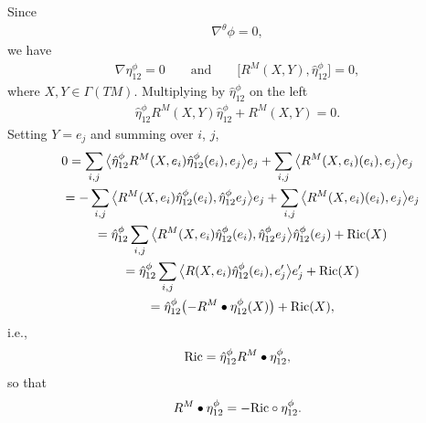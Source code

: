 \documentclass[pdftex]{sigma}
\numberwithin{equation}{section}
\begin{document}
Since
\begin{gather*}\nabla^\theta \phi =0,\end{gather*}
we have
\begin{gather*}
 \nabla \eta_{12}^\phi= 0
\qquad \text{and}\qquad
\big[{R^M(X,Y)},\hat\eta_{12}^\phi\big] =0,\end{gather*}
where $X,Y\in\Gamma(TM)$. Multiplying by $\hat\eta_{12}^\phi$ on the left
\begin{gather*}
\hat{\eta}^\phi_{12}{R^M(X,Y)}\hat{\eta}^\phi_{12}+{R^M(X,Y)} =0.
\end{gather*}
Setting $Y=e_j$ and summing over $i$, $j$,
\begin{gather*}
0=\sum_{i,j}\big\langle \hat{\eta}^\phi_{12}{R^M(X,e_i)}\hat{\eta}^\phi_{12}(e_i),e_j\big\rangle e_j+\sum_{i,j}\big\langle {R^M(X,e_i)}(e_i),e_j\big\rangle e_j\\
\hphantom{0}{} = -\sum_{i,j}\big\langle {R^M(X,e_i)}\hat{\eta}^\phi_{12}(e_i),\hat{\eta}^\phi_{12}e_j\big\rangle e_j+\sum_{i,j}\big\langle {R^M(X,e_i)}(e_i),e_j\big\rangle e_j\\
\hphantom{0}{} = \hat\eta_{12}^\phi\sum_{i,j}\big\langle {R^M(X,e_i)}\hat{\eta}^\phi_{12}(e_i),\hat{\eta}^\phi_{12}e_j\big\rangle \hat\eta_{12}^\phi (e_j)+{\rm Ric}(X)\\
\hphantom{0}{} = \hat\eta_{12}^\phi\sum_{i,j}\big\langle {R(X,e_i)}\hat{\eta}^\phi_{12}(e_i),e_j'\big\rangle e_j' +{\rm Ric}(X)\\
\hphantom{0}{} = \hat\eta_{12}^\phi\big({-}{R^M\bullet\eta_{12}^\phi}(X)\big)+{\rm Ric}(X) ,
\end{gather*}
i.e.,
\begin{gather*}
{\rm Ric} =\hat\eta_{12}^\phi{R^M\bullet\eta_{12}^\phi},
\end{gather*}
so that
\begin{gather*}
{R^M\bullet\eta_{12}^\phi} =-{\rm Ric} \circ\eta_{12}^\phi.
\end{gather*}
\end{document}
